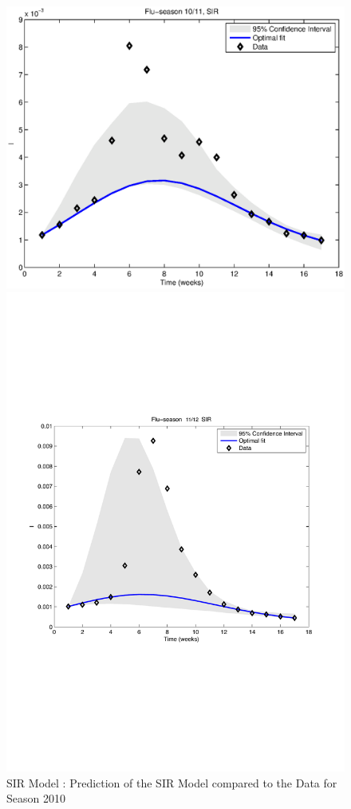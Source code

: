 \documentclass[11pt, a4paper]{article}
\begin{document}
\begin{figure}[h]
\FloatBarrier
\centering
    \includegraphics[height = 0.25\textheight]{figures/SIR_prediction_season1.eps}
    \caption{SIR Model : Prediction of the SIR Model compared to the Data for Season 2010}
    \label{fig:sir_pred1}
    \includegraphics[height = 0.25\textheight]{figures/SIR_prediction_season2.pdf}

\end{figure}
\end{document}
